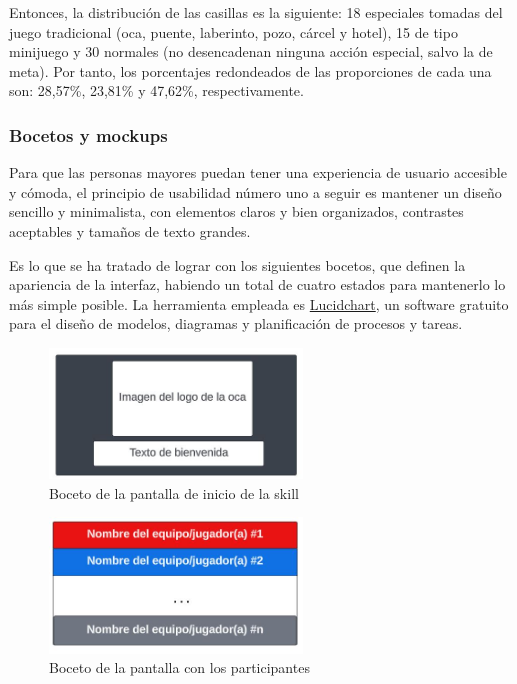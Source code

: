 Entonces, la distribución de las casillas es la siguiente: 18 especiales tomadas del juego tradicional (oca, puente, laberinto, pozo, cárcel y hotel), 15 de tipo minijuego y 30 normales (no desencadenan ninguna acción especial, salvo la de meta). Por tanto, los porcentajes redondeados de las proporciones de cada una son: 28,57\%, 23,81\% y 47,62\%, respectivamente. 

\subsubsection{Bocetos y mockups}

Para que las personas mayores puedan tener una experiencia de usuario accesible y cómoda, el principio de usabilidad número uno a seguir es mantener un diseño sencillo y minimalista, con elementos claros y bien organizados, contrastes aceptables y tamaños de texto grandes. 

Es lo que se ha tratado de lograr con los siguientes bocetos, que definen la apariencia de la interfaz, habiendo un total de cuatro estados para mantenerlo lo más simple posible. La herramienta empleada es \href{https://www.lucidchart.com/pages/es}{Lucidchart}, un software gratuito para el diseño de modelos, diagramas y planificación de procesos y tareas.

\begin{figure}[H]
    \centering
    \includegraphics[width=0.6\textwidth]{imgs/boceto-bienvenida.JPG}
    \caption{Boceto de la pantalla de inicio de la skill}
    \label{fig:boceto-bienvenida}
\end{figure}

\begin{figure}[H]
    \centering
    \includegraphics[width=0.6\textwidth]{imgs/boceto-fichas.JPG}
    \caption{Boceto de la pantalla con los participantes}
    \label{fig:boceto-fichas}
\end{figure}

